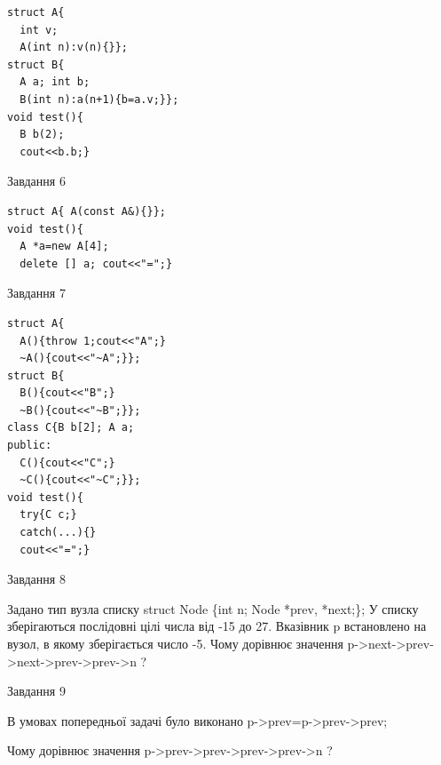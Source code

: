 \documentclass[12pt, ukrainian]{article}
\begin{document}
{{{{{{{{{{{{\begin{minipage}[t]{7cm}
\begin{verbatim}
struct A{
  int v;
  A(int n):v(n){}};
struct B{
  A a; int b;
  B(int n):a(n+1){b=a.v;}};
void test(){
  B b(2);
  cout<<b.b;}
\end{verbatim}            


               
{\begin{center}Завдання {6}\end{center}}
\vspace{-6mm}

\begin{verbatim}
struct A{ A(const A&){}};
void test(){
  A *a=new A[4]; 
  delete [] a; cout<<"=";} 
\end{verbatim}            


               
{\begin{center}Завдання {7}\end{center}}
\vspace{-6mm}

\begin{verbatim}
struct A{
  A(){throw 1;cout<<"A";}
  ~A(){cout<<"~A";}};
struct B{
  B(){cout<<"B";}
  ~B(){cout<<"~B";}};
class C{B b[2]; A a;
public:
  C(){cout<<"C";}
  ~C(){cout<<"~C";}};
void test(){
  try{C c;} 
  catch(...){} 
  cout<<"=";}
\end{verbatim}            


\end{minipage}
               
{\begin{center}Завдання {8}\end{center}}
\vspace{-6mm}
Задано тип вузла списку
struct Node \{int n; Node *prev, *next;\};
У списку зберігаються послідовні цілі числа від -15 до 27. Вказівник p встановлено на вузол, в якому зберігається число -5.
Чому дорівнює значення p->next->prev->next->prev->prev->n ?\par

               
{\begin{center}Завдання {9}\end{center}}
\vspace{-6mm}
В умовах попередньої задачі було виконано p->prev=p->prev->prev;

Чому дорівнює значення p->prev->prev->prev->prev->n ?\par

\newpage
               
}}}}}}}}}}}}
\end{document}
